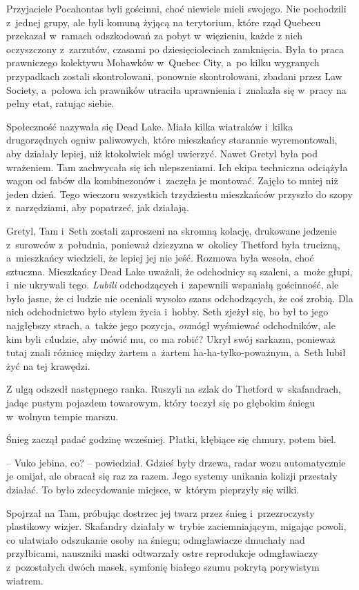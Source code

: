 \documentclass[oneside,polish,11pt,sfheadings]{mwbk}
\begin{document}
Przyjaciele Pocahontas byli gościnni, choć niewiele mieli swojego. Nie
pochodzili z~jednej grupy, ale byli komuną żyjącą na terytorium, które
rząd Quebecu przekazał w~ramach odszkodowań za pobyt w~więzieniu, każde
z nich oczyszczony z~zarzutów, czasami po dziesięcioleciach zamknięcia.
Była to praca prawniczego kolektywu Mohawków w~Quebec City, a~po kilku
wygranych przypadkach zostali skontrolowani, ponownie skontrolowani,
zbadani przez Law Society, a~połowa ich prawników utraciła uprawnienia i~znalazła się w~pracy na pełny etat, ratując siebie.

Społeczność nazywała się Dead Lake. Miała kilka wiatraków i~kilka
drugorzędnych ogniw paliwowych, które mieszkańcy starannie
wyremontowali, aby działały lepiej, niż ktokolwiek mógł uwierzyć. Nawet
Gretyl była pod wrażeniem. Tam zachwycała się ich ulepszeniami. Ich
ekipa techniczna odciążyła wagon od fabów dla kombinezonów i~zaczęła je
montować. Zajęło to mniej niż jeden dzień. Tego wieczoru wszystkich
trzydziestu mieszkańców przyszło do szopy z~narzędziami, aby popatrzeć,
jak działają.

Gretyl, Tam i~Seth zostali zaproszeni na skromną kolację, drukowane
jedzenie z~surowców z~południa, ponieważ dziczyzna w~okolicy Thetford
była trucizną, a~mieszkańcy wiedzieli, że lepiej jej nie jeść. Rozmowa
była wesoła, choć sztuczna. Mieszkańcy Dead Lake uważali, że odchodnicy
są szaleni, a~może głupi, i~nie ukrywali tego. \textit{Lubili}
odchodzących i~zapewnili wspaniałą gościnność, ale było jasne, że ci
ludzie nie oceniali wysoko szans odchodzących, że coś zrobią. Dla nich
odchodnictwo było stylem życia i~hobby. Seth zjeżył się, bo był to jego
najgłębszy strach, a~także jego pozycja, \textit{on}mógł wyśmiewać
odchodników, ale kim byli \textit{ci}ludzie, aby mówić mu, co ma robić?
Ukrył swój sarkazm, ponieważ tutaj znali różnicę między żartem a~żartem
ha-ha-tylko-poważnym, a~Seth lubił żyć na tej krawędzi.

Z ulgą odszedł następnego ranka. Ruszyli na szlak do Thetford w~skafandrach, jadąc pustym pojazdem towarowym, który toczył się po
głębokim śniegu w~wolnym tempie marszu.

Śnieg zaczął padać godzinę wcześniej. Płatki, kłębiące się chmury, potem
biel.

-- Vuko jebina, co? -- powiedział. Gdzieś były drzewa, radar wozu
automatycznie je omijał, ale obracał się raz za razem. Jego systemy
unikania kolizji przestały działać. To było zdecydowanie miejsce, w~którym pieprzyły się wilki.

Spojrzał na Tam, próbując dostrzec jej twarz przez śnieg i~przezroczysty
plastikowy wizjer. Skafandry działały w~trybie zaciemniającym, migając
powoli, co ułatwiało odszukanie osoby na śniegu; odmgławiacze dmuchały
nad przyłbicami, nauszniki maski odtwarzały ostre reprodukcje
odmgławiaczy z~pozostałych dwóch masek, symfonię białego szumu pokrytą
porywistym wiatrem.
\end{document}

